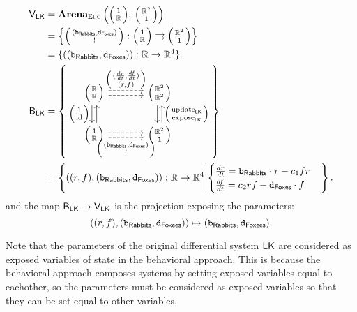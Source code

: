 \documentclass[DynamicalBook]{subfiles}
\begin{document}
\begin{example}
\begin{align*}
  \Set{V}_{\Sys{LK}} &= \Cat{Arena}_{\eucdiff}\left( \littlelens{\ord{1}}{\rr},\,
                       \littlelens{\rr^2}{\ord{1}} \right)\\
                     &= \left\{
\lens{(\const{b}_{\Sys{Rabbits}}, \const{d}_{\Sys{Foxes}})}{!} : \lens{\ord{1}}{\rr} \rightrightarrows \lens{\rr^2}{\ord{1}}
                       \right\} \\
  &= \{((\const{b}_{\Sys{Rabbits}}, \const{d}_{\Sys{Foxes}})) : \rr \to \rr^4\}.\\
  \Set{B}_{\Sys{LK}} &= \left\{
    \begin{tikzcd}[ampersand replacement = \&, column sep = large]
      \lens{\rr}{\rr} \ar[r, shift left, dashed, "\lens{(\frac{dr}{dt}, \frac{df}{dt})}{(r, f)}"] \ar[r, dashed, shift right] \ar[d, shift right,
      "\lens{1}{\id}"'] \ar[d, shift left, leftarrow] \&
      \lens{\rr^2}{\rr^2} \ar[d, shift left, leftarrow,
      "\lens{\update{LK}}{\expose{LK}}"] \ar[d, shift right]\\
      \lens{\ord{1}}{\rr} \ar[r, dashed, shift right, "{\lens{(\const{b}_{\Sys{Rabbits}}, \const{d}_{\Sys{Foxes}})}{!}}"'] \ar[r, dashed,
      shift left] \& \lens{\rr^2}{\ord{1}}
    \end{tikzcd}
  \right\} \\
  &= \left\{((r, f),(\const{b}_{\Sys{Rabbits}}, \const{d}_{\Sys{Foxes}})) : \rr \to \rr^4 \middle| \begin{cases}
\frac{dr}{dt} =  \const{b}_{\Sys{Rabbits}}
\cdot r - c_1 f r \\
\frac{df}{dt} = c_2 r f - \const{d}_{\Sys{Foxes}}
\cdot f
  \end{cases}\right\}.\\
\end{align*}
and the map $\mathsf{B}_{\mathsf{LK}} \to \mathsf{V}_{\mathsf{LK}}$ is the projection
exposing the parameters:
\[
((r, f), (\mathtt{b}_{\mathsf{Rabbits}},
\mathtt{d}_{\mathsf{Foxees}})) \mapsto (\mathtt{b}_{\mathsf{Rabbits}},
\mathtt{d}_{\mathsf{Foxees}}).
\]
\end{example}
\begin{remark}
Note
that the parameters of the original differential system
$\mathsf{LK}$ are considered as exposed variables of state in the behavioral
approach. This is because the behavioral approach composes systems by setting
exposed variables equal to eachother, so the parameters must be considered as
exposed variables so that they can be set equal to other variables.
\end{remark}
\end{document}
